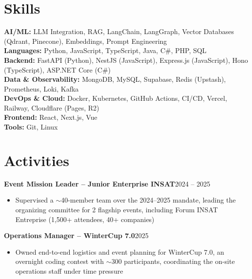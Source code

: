 \documentclass[10pt,a4paper]{article}
\newcommand{\entry}[2]{\vspace{1pt}\noindent\textbf{#1}\hfill{\color{muted}#2}\par}
\begin{document}
\section{Skills}
\textbf{AI/ML:} LLM Integration, RAG, LangChain, LangGraph, Vector Databases (Qdrant, Pinecone), Embeddings, Prompt Engineering\\
\textbf{Languages:} Python, JavaScript, TypeScript, Java, C\#, PHP, SQL\\
\textbf{Backend:} FastAPI (Python), NestJS (JavaScript), Express.js (JavaScript), Hono (TypeScript), ASP.NET Core (C\#)\\
\textbf{Data \& Observability:} MongoDB, MySQL, Supabase, Redis (Upstash), Prometheus, Loki, Kafka\\
\textbf{DevOps \& Cloud:} Docker, Kubernetes, GitHub Actions, CI/CD, Vercel, Railway, Cloudflare (Pages, R2)\\
\textbf{Frontend:} React, Next.js, Vue\\
\textbf{Tools:} Git, Linux

\section{Activities}
\entry{Event Mission Leader -- Junior Enterprise INSAT}{2024 -- 2025}
\begin{itemize}
  \item Supervised a $\sim$40-member team over the 2024--2025 mandate, leading the organizing committee for 2 flagship events, including Forum INSAT Entreprise (1,500+ attendees, 40+ companies)
\end{itemize}
\entry{Operations Manager -- WinterCup 7.0}{2025}
\begin{itemize}
  \item Owned end-to-end logistics and event planning for WinterCup 7.0, an overnight coding contest with $\sim$300 participants, coordinating the on-site operations staff under time pressure
\end{itemize}
\end{document}
